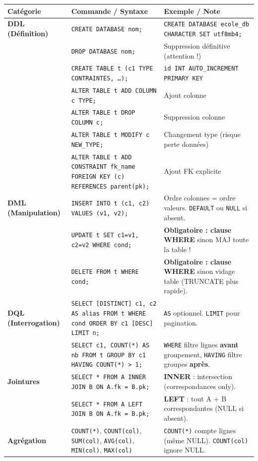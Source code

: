 \documentclass[11pt]{article}
\begin{document}
\begin{bilan}
\begin{center}
\begin{tabularx}{\linewidth}{|>{\bfseries}l|X|X|}
\hline
\rowcolor{popblueL}
\textbf{Catégorie} & \textbf{Commande / Syntaxe} & \textbf{Exemple / Note} \\
\hline
\textbf{DDL (Définition)} & \texttt{CREATE DATABASE nom;} & \texttt{CREATE DATABASE ecole\_db CHARACTER SET utf8mb4;} \\
& \texttt{DROP DATABASE nom;} & Suppression définitive (attention !) \\
& \texttt{CREATE TABLE t (c1 TYPE CONTRAINTES, \dots);} & \texttt{id INT AUTO\_INCREMENT PRIMARY KEY} \\
& \texttt{ALTER TABLE t ADD COLUMN c TYPE;} & Ajout colonne \\
& \texttt{ALTER TABLE t DROP COLUMN c;} & Suppression colonne \\
& \texttt{ALTER TABLE t MODIFY c NEW\_TYPE;} & Changement type (risque perte données) \\
& \texttt{ALTER TABLE t ADD CONSTRAINT fk\_name FOREIGN KEY (c) REFERENCES parent(pk);} & Ajout FK explicite \\
\hline
\textbf{DML (Manipulation)} & \texttt{INSERT INTO t (c1, c2) VALUES (v1, v2);} & Ordre colonnes = ordre valeurs. \texttt{DEFAULT} ou \texttt{NULL} si absent. \\
& \texttt{UPDATE t SET c1=v1, c2=v2 WHERE cond;} & \textbf{Obligatoire : clause WHERE} sinon MAJ toute la table ! \\
& \texttt{DELETE FROM t WHERE cond;} & \textbf{Obligatoire : clause WHERE} sinon vidage table (TRUNCATE plus rapide). \\
\hline
\textbf{DQL (Interrogation)} & \texttt{SELECT [DISTINCT] c1, c2 AS alias FROM t WHERE cond ORDER BY c1 [DESC] LIMIT n;} & \texttt{AS} optionnel. \texttt{LIMIT} pour pagination. \\
& \texttt{SELECT c1, COUNT(*) AS nb FROM t GROUP BY c1 HAVING COUNT(*) > 1;} & \texttt{WHERE} filtre lignes \textbf{avant} groupement, \texttt{HAVING} filtre groupes \textbf{après}. \\
\hline
\textbf{Jointures} & \texttt{SELECT * FROM A INNER JOIN B ON A.fk = B.pk;} & \textbf{INNER} : intersection (correspondances only). \\
& \texttt{SELECT * FROM A LEFT JOIN B ON A.fk = B.pk;} & \textbf{LEFT} : tout A + B correspondantes (NULL si absent). \\
\hline
\textbf{Agrégation} & \texttt{COUNT(*)}, \texttt{COUNT(col)}, \texttt{SUM(col)}, \texttt{AVG(col)}, \texttt{MIN(col)}, \texttt{MAX(col)} & \texttt{COUNT(*)} compte lignes (même NULL). \texttt{COUNT(col)} ignore NULL. \\

\end{tabularx}
\end{center}
\end{bilan}
\end{document}
